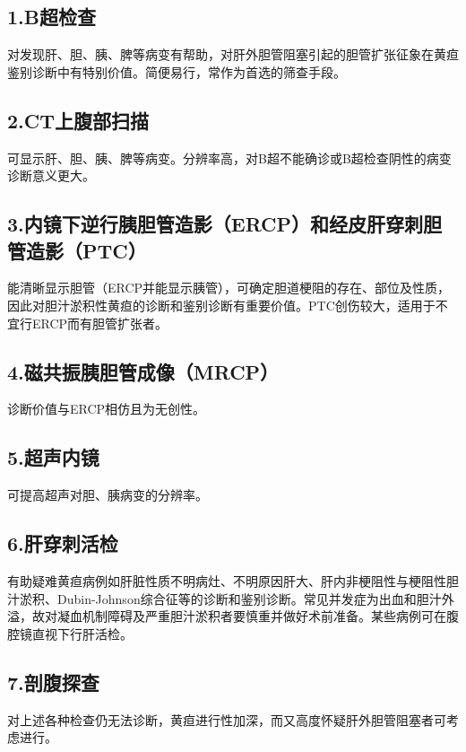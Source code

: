 \subsection{1.B超检查}

对发现肝、胆、胰、脾等病变有帮助，对肝外胆管阻塞引起的胆管扩张征象在黄疸鉴别诊断中有特别价值。简便易行，常作为首选的筛查手段。

\subsection{2.CT上腹部扫描}

可显示肝、胆、胰、脾等病变。分辨率高，对B超不能确诊或B超检查阴性的病变诊断意义更大。

\subsection{3.内镜下逆行胰胆管造影（ERCP）和经皮肝穿刺胆管造影（PTC）}

能清晰显示胆管（ERCP并能显示胰管），可确定胆道梗阻的存在、部位及性质，因此对胆汁淤积性黄疸的诊断和鉴别诊断有重要价值。PTC创伤较大，适用于不宜行ERCP而有胆管扩张者。

\subsection{4.磁共振胰胆管成像（MRCP）}

诊断价值与ERCP相仿且为无创性。

\subsection{5.超声内镜}

可提高超声对胆、胰病变的分辨率。

\subsection{6.肝穿刺活检}

有助疑难黄疸病例如肝脏性质不明病灶、不明原因肝大、肝内非梗阻性与梗阻性胆汁淤积、Dubin-Johnson综合征等的诊断和鉴别诊断。常见并发症为出血和胆汁外溢，故对凝血机制障碍及严重胆汁淤积者要慎重并做好术前准备。某些病例可在腹腔镜直视下行肝活检。

\subsection{7.剖腹探查}

对上述各种检查仍无法诊断，黄疸进行性加深，而又高度怀疑肝外胆管阻塞者可考虑进行。

